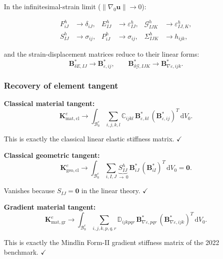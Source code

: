 \documentclass[11pt]{article}
\begin{document}
In the infinitesimal-strain limit ($\|\nabla_{0}\mathbf{u}\|\to 0$):

\begin{align}
F_{iJ}^{h} &\to \delta_{iJ},
&
E_{IJ}^{h} &\to \varepsilon_{IJ}^{h},
&
\mathcal{G}_{IJK}^{h} &\to \varepsilon_{IJ,K}^{h},
\label{s7:lim_kin}\\
S_{IJ}^{h} &\to \sigma_{ij},
&
P_{iJ}^{h} &\to \sigma_{ij},
&
\Sigma_{IJK}^{h} &\to h_{ijk},
\label{s7:lim_stress}
\end{align}

and the strain-displacement matrices reduce to their linear forms:
\begin{equation}
\mathbf{B}_{\delta E,IJ}^{*} \to \mathbf{B}_{\varepsilon,ij}^{*},
\qquad
\mathbf{B}_{\delta\mathcal{G},IJK}^{*} \to \mathbf{B}_{\nabla\varepsilon,ijk}^{*}.
\end{equation}

\subsubsection{Recovery of element tangent}

\textbf{Classical material tangent:}
\begin{equation}
\mathbf{K}_{\mathrm{mat,cl}}^{e}
\to \int_{\mathcal{B}_{0}^{e}}
  \sum_{i,j,k,l}
  \mathbb{C}_{ijkl}\,
  \mathbf{B}_{\varepsilon,kl}^{*}\,
  (\mathbf{B}_{\varepsilon,ij}^{*})^{T}\,
  \mathrm{d}V_{0}.
\end{equation}

This is exactly the classical linear elastic stiffness matrix. $\checkmark$

\textbf{Classical geometric tangent:}
\begin{equation}
\mathbf{K}_{\mathrm{geo,cl}}^{e}
\to \int_{\mathcal{B}_{0}^{e}}
  \sum_{i,I,J}
  \underbrace{S_{IJ}^{h}}_{\to\,0}\,
  \mathbf{B}_{iJ}^{*}\,
  (\mathbf{B}_{iI}^{*})^{T}\,
  \mathrm{d}V_{0}
= \mathbf{0}.
\end{equation}

Vanishes because $S_{IJ}=\mathbf{0}$ in the linear theory. $\checkmark$

\textbf{Gradient material tangent:}
\begin{equation}
\mathbf{K}_{\mathrm{mat,gr}}^{e}
\to \int_{\mathcal{B}_{0}^{e}}
  \sum_{i,j,k,p,q,r}
  \mathbb{D}_{ijkpqr}\,
  \mathbf{B}_{\nabla\varepsilon,pqr}^{*}\,
  (\mathbf{B}_{\nabla\varepsilon,ijk}^{*})^{T}\,
  \mathrm{d}V_{0}.
\end{equation}

This is exactly the Mindlin Form-II gradient stiffness matrix of the
2022 benchmark. $\checkmark$
\end{document}
